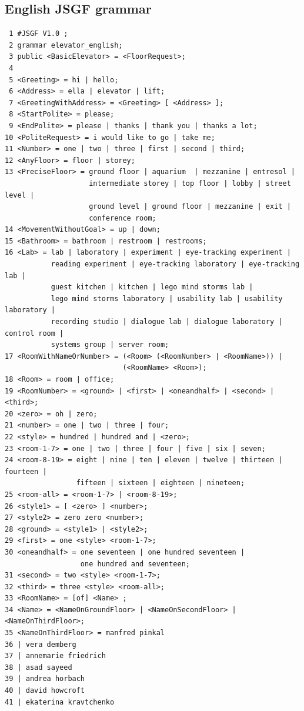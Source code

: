 \documentclass[a4paper, 12pt]{article}
\begin{document}
\subsection{English JSGF grammar}
\begin{verbatim}
 1 #JSGF V1.0 ;
 2 grammar elevator_english;
 3 public <BasicElevator> = <FloorRequest>;
 4
 5 <Greeting> = hi | hello;
 6 <Address> = ella | elevator | lift;
 7 <GreetingWithAddress> = <Greeting> [ <Address> ];
 8 <StartPolite> = please;
 9 <EndPolite> = please | thanks | thank you | thanks a lot;
10 <PoliteRequest> = i would like to go | take me;
11 <Number> = one | two | three | first | second | third;
12 <AnyFloor> = floor | storey;
13 <PreciseFloor> = ground floor | aquarium  | mezzanine | entresol | 
                    intermediate storey | top floor | lobby | street level | 
                    ground level | ground floor | mezzanine | exit |
                    conference room;
14 <MovementWithoutGoal> = up | down;
15 <Bathroom> = bathroom | restroom | restrooms;
16 <Lab> = lab | laboratory | experiment | eye-tracking experiment |
           reading experiment | eye-tracking laboratory | eye-tracking lab |
           guest kitchen | kitchen | lego mind storms lab | 
           lego mind storms laboratory | usability lab | usability laboratory |
           recording studio | dialogue lab | dialogue laboratory | control room |
           systems group | server room;
17 <RoomWithNameOrNumber> = (<Room> (<RoomNumber> | <RoomName>)) | 
                            (<RoomName> <Room>);
18 <Room> = room | office;
19 <RoomNumber> = <ground> | <first> | <oneandhalf> | <second> | <third>;
20 <zero> = oh | zero;
21 <number> = one | two | three | four;
22 <style> = hundred | hundred and | <zero>;
23 <room-1-7> = one | two | three | four | five | six | seven;
24 <room-8-19> = eight | nine | ten | eleven | twelve | thirteen | fourteen | 
                 fifteen | sixteen | eighteen | nineteen;
25 <room-all> = <room-1-7> | <room-8-19>;
26 <style1> = [ <zero> ] <number>;
27 <style2> = zero zero <number>;
28 <ground> = <style1> | <style2>;
29 <first> = one <style> <room-1-7>;
30 <oneandhalf> = one seventeen | one hundred seventeen |
                  one hundred and seventeen;
31 <second> = two <style> <room-1-7>;
32 <third> = three <style> <room-all>;
33 <RoomName> = [of] <Name> ;
34 <Name> = <NameOnGroundFloor> | <NameOnSecondFloor> | <NameOnThirdFloor>;
35 <NameOnThirdFloor> = manfred pinkal
36 | vera demberg
37 | annemarie friedrich
38 | asad sayeed
39 | andrea horbach
40 | david howcroft
41 | ekaterina kravtchenko

\end{verbatim}
\end{document}
